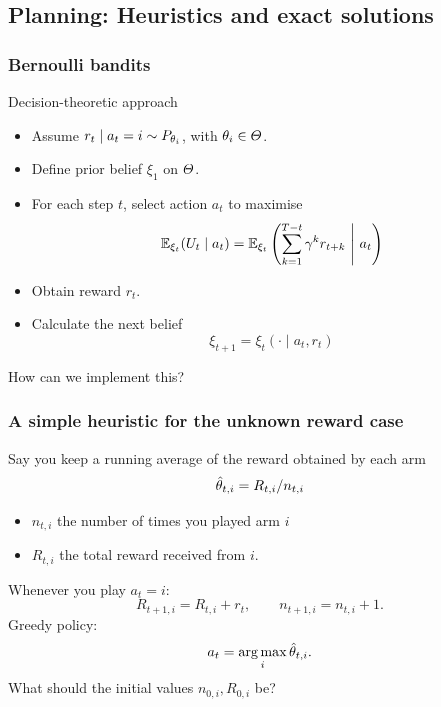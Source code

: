 \documentclass[9pt]{beamer}
\begin{document}
\subsection{Planning: Heuristics and exact solutions}
\label{sec:exp-design-bandit}

\begin{frame}
  \frametitle{Bernoulli bandits}
  \begin{block}{Decision-theoretic approach}
    \begin{itemize}
    \item Assume $r_t \mid a_t = i \sim P_{\theta_i}$, with $\theta_i\in \Theta$.
    \item Define prior belief  $\xi_1$ on $\Theta$.
    \item For each step $t$, select action $a_t$ to maximise 
      \[
        \mathop{\mbox{\ensuremath{\mathbb{E}}}}\nolimits_{\xi_t}( U_t  \mid a_t) = \mathop{\mbox{\ensuremath{\mathbb{E}}}}\nolimits_{\xi_t} \left(\sum_{k=1}^{T-t} \gamma^k r_{t+k} ~\middle|~ a_t \right)
      \]
    \item Obtain reward $r_t$.
    \item Calculate the next belief
      \[
        \xi_{t+1} = \xi_t(\cdot \mid a_t, r_t)
      \]
    \end{itemize}
  \end{block}
  How can we implement this?
\end{frame}


\begin{frame}
  \frametitle{A simple heuristic for the unknown reward case}
  Say you keep a \alert{running average} of the reward obtained by each arm
  \[
  \hat{\theta}_{t,i} = R_{t,i} / n_{t,i}
  \]
  \begin{itemize}
  \item $n_{t,i}$ the number of times you played arm $i$ 
  \item $R_{t,i}$ the total reward received from $i$.
  \end{itemize}
  Whenever you play $a_t = i$:
  \[
  R_{t+1, i} = R_{t,i} + r_t, \qquad n_{t+1,i} = n_{t,i} + 1.
  \]
  Greedy policy:
  \[
  a_t = \mathop{\rm arg\,max}_i \hat{\theta}_{t,i}.
  \]
  What should the initial values $n_{0,i}, R_{0,i}$ be?
\end{frame}
\end{document}

